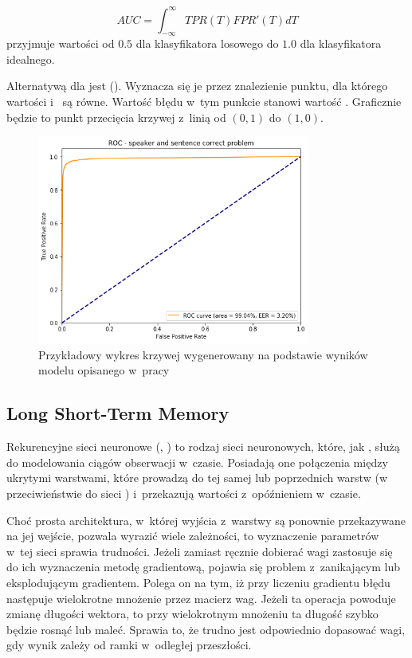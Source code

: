$$\mathit{AUC} = \int_{-\infty}^{\infty} \mathit{TPR}(T) \mathit{FPR}'(T) dT$$
 przyjmuje wartości od $0.5$ dla klasyfikatora losowego do $1.0$ dla klasyfikatora idealnego.

Alternatywą dla  jest  (). Wyznacza się je
przez znalezienie punktu, dla którego wartości  i~ są równe. Wartość błędu
w~tym punkcie stanowi wartość . Graficznie będzie to punkt przecięcia krzywej 
z~linią od $(0, 1)$ do $(1, 0)$.

\begin{figure}[H]
    \centering
    \includegraphics[width=0.8\textwidth]{images/2_2_b_roc_example}
    \caption{Przykładowy wykres krzywej  wygenerowany na podstawie wyników modelu  opisanego w~pracy}
    \label{fig:2_2_b_roc_example}
\end{figure}

\subsection{Long Short-Term Memory}

Rekurencyjne sieci neuronowe (, ) to rodzaj sieci neuronowych,
które, jak , służą do modelowania ciągów obserwacji w~czasie. Posiadają one połączenia między
ukrytymi warstwami, które prowadzą do tej samej lub poprzednich warstw
(w przeciwieństwie do sieci ) i~przekazują wartości z~opóźnieniem
w~czasie\cite{onTheDifficulty}.

Choć prosta architektura, w~której wyjścia z~warstwy są ponownie przekazywane na jej wejście, pozwala
wyrazić wiele zależności, to wyznaczenie parametrów w~tej sieci sprawia trudności. Jeżeli zamiast
ręcznie dobierać wagi zastosuje się do ich wyznaczenia metodę gradientową, pojawia się problem
z~zanikającym lub eksplodującym gradientem. Polega on na tym, iż przy liczeniu gradientu błędu
następuje wielokrotne mnożenie przez macierz wag. Jeżeli ta operacja powoduje zmianę długości
wektora, to przy wielokrotnym mnożeniu ta długość szybko będzie rosnąć lub maleć. Sprawia to,
że trudno jest odpowiednio dopasować wagi, gdy wynik zależy od ramki w~odległej przeszłości.

